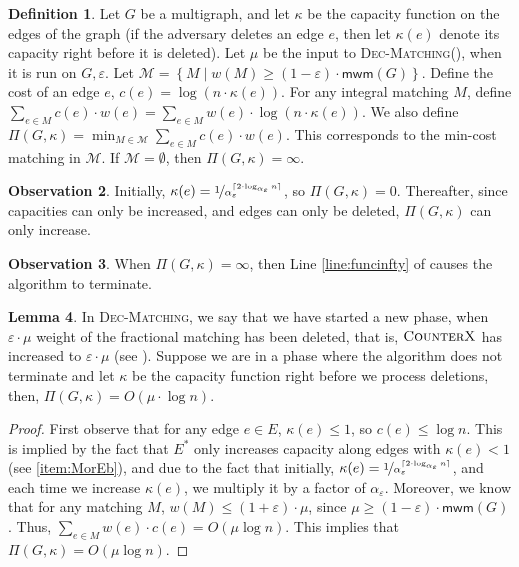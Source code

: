 \documentclass[a4paper,11pt]{article}
\newcommand{\set}[1]{\ensuremath{\left\{ #1 \right\}}}
\newcommand{\eps}{\varepsilon}
\theoremstyle{definition}
\newtheorem{definition2}{Definition}
\theoremstyle{definition}
\theoremstyle{definition}
\theoremstyle{definition}
\theoremstyle{definition}
\newtheorem{lemma2}[definition2]{Lemma}
\theoremstyle{definition}
\theoremstyle{definition}
\newtheorem{observation2}[definition2]{Observation}
\theoremstyle{definition}
\theoremstyle{definition}
\theoremstyle{definition}
\theoremstyle{definition}
\theoremstyle{definition}
\theoremstyle{definition}
\theoremstyle{definition}
\theoremstyle{definition}
\begin{document}
\begin{definition2}
Let $G$ be a multigraph, and let $\kappa$ be the capacity function on the edges of the graph (if the adversary deletes an edge $e$, then let $\kappa(e)$ denote its capacity right before it is deleted). Let $\mu$ be the input to \textsc{Dec-Matching}(), when it is run on $G,\eps$. Let $\mathcal{M}=\set{M\mid w(M)\geqslant (1-\eps)\cdot \textsf{mwm}(G)}$. Define the cost of an edge $e$, $c(e)=\log (n\cdot \kappa(e))$. For any integral matching $M$, define $\sum_{e\in M}c(e)\cdot w(e)=\sum_{e\in M}w(e)\cdot \log (n\cdot \kappa(e))$. We also define $\Pi(G,\kappa)=\min_{M\in \mathcal{M}}\sum_{e\in M} c(e)\cdot w(e)$. This corresponds to the min-cost matching in $\mathcal{M}$. If $\mathcal{M}=\emptyset$, then $\Pi(G,\kappa)=\infty$. 
\end{definition2}

\begin{observation2}
Initially, $\kappa(e)=\nicefrac{1}{\alpha_{\eps}^{\lceil 2\cdot\log_{\alpha_{\eps}}n \rceil}}$, so $\Pi(G,\kappa)=0$. Thereafter, since capacities can only be increased, and edges can only be deleted, $\Pi(G,\kappa)$ can only increase.
\end{observation2}

\begin{observation2}
When $\Pi(G,\kappa)=\infty$, then Line \ref{line:funcinfty} of  causes the algorithm to terminate. 
\end{observation2}

\begin{lemma2}\label{lem:upperbdpotential}
In \textsc{Dec-Matching}, we say that we have started a new phase, when $\eps\cdot\mu$ weight of the fractional matching has been deleted, that is, $\textsc{CounterX}$ has increased to $\eps\cdot \mu$ (see ). Suppose we are in a phase where the algorithm does not terminate and let $\kappa$ be the capacity function right before we process deletions, then, $\Pi(G,\kappa)=O(\mu\cdot \log n)$.
\end{lemma2}

\begin{proof}
First observe that for any edge $e\in E$, $\kappa(e)\leqslant 1$, so $c(e)\leqslant \log n$. This is implied by the fact that $E^*$ only increases capacity along edges with $\kappa(e)<1$ (see \ref{item:MorEb}), and due to the fact that initially,  $\kappa(e)=\nicefrac{1}{\alpha_{\eps}^{\lceil 2\cdot \log_{\alpha_{\eps}}n \rceil}}$, and each time we increase $\kappa(e)$, we multiply it by a factor of $\alpha_{\eps}$. Moreover, we know that for any matching $M$, $w(M)\leqslant (1+\eps)\cdot \mu$, since $\mu\geqslant (1-\eps)\cdot\textsf{mwm}(G)$. Thus, $\sum_{e\in M} w(e)\cdot c(e)=O(\mu \log n)$. This implies that $\Pi(G,\kappa)=O(\mu\log n)$. 
\end{proof}
\end{document}
